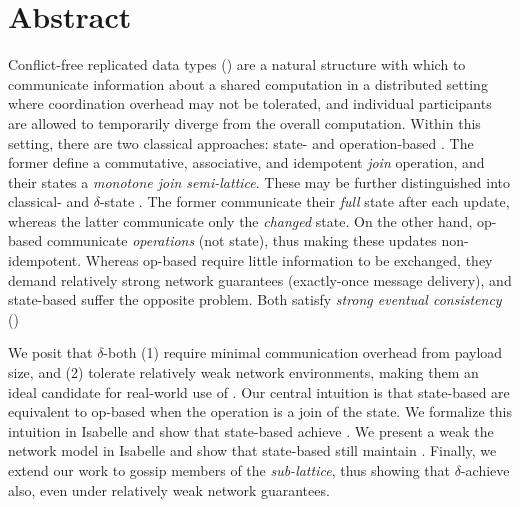 \chapter*{Abstract}

Conflict-free replicated data types (\CRDTs) are a natural structure with which
to communicate information about a shared computation in a distributed setting
where coordination overhead may not be tolerated, and individual participants
are allowed to temporarily diverge from the overall computation.  Within this
setting, there are two classical approaches: state- and operation-based \CRDTs.
The former define a commutative, associative, and idempotent \textit{join}
operation, and their states a \textit{monotone join semi-lattice}. These may be
further distinguished into classical- and $\delta$-state
\CRDTs. The former communicate their \emph{full} state after
each update, whereas the latter communicate only the \emph{changed} state. On
the other hand, op-based \CRDTs communicate \emph{operations} (not state), thus
making these updates non-idempotent.  Whereas op-based \CRDTs require little
information to be exchanged, they demand relatively strong network guarantees
(exactly-once message delivery), and state-based \CRDTs suffer the opposite
problem. Both satisfy \textit{strong eventual consistency} (\SEC)

We posit that $\delta$-\CRDTs both (1) require minimal communication overhead
from payload size, and (2) tolerate relatively weak network environments, making
them an ideal candidate for real-world use of \CRDTs. Our central intuition is
that state-based \CRDTs are equivalent to op-based \CRDTs when the operation is
a join of the state. We formalize this intuition in Isabelle and show that
state-based \CRDTs achieve \SEC. We present a weak the network model in Isabelle
and show that state-based \CRDTs still maintain \SEC. Finally, we extend our
work to gossip members of the \textit{sub-lattice}, thus showing that
$\delta$-\CRDTs achieve \SEC also, even under relatively weak network
guarantees.
